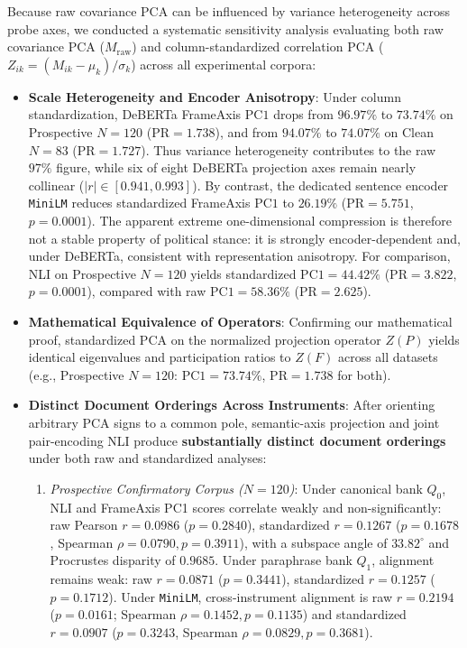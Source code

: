 Because raw covariance PCA can be influenced by variance heterogeneity across probe axes, we conducted a systematic sensitivity analysis evaluating both raw covariance PCA ($M_{\text{raw}}$) and column-standardized correlation PCA ($Z_{ik} = (M_{ik} - \mu_k) / \sigma_k$) across all experimental corpora:
\begin{itemize}
    \item \textbf{Scale Heterogeneity and Encoder Anisotropy}: Under column standardization, DeBERTa FrameAxis $\mathrm{PC1}$ drops from $96.97\%$ to $\mathbf{73.74\%}$ on Prospective $N=120$ ($\mathrm{PR} = 1.738$), and from $94.07\%$ to $\mathbf{74.07\%}$ on Clean $N=83$ ($\mathrm{PR} = 1.727$). Thus variance heterogeneity contributes to the raw $97\%$ figure, while six of eight DeBERTa projection axes remain nearly collinear ($|r| \in [0.941, 0.993]$). By contrast, the dedicated sentence encoder \texttt{MiniLM} reduces standardized FrameAxis $\mathrm{PC1}$ to $26.19\%$ ($\mathrm{PR} = 5.751$, $p = 0.0001$). The apparent extreme one-dimensional compression is therefore not a stable property of political stance: it is strongly encoder-dependent and, under DeBERTa, consistent with representation anisotropy. For comparison, NLI on Prospective $N=120$ yields standardized $\mathrm{PC1} = \mathbf{44.42\%}$ ($\mathrm{PR} = 3.822$, $p = 0.0001$), compared with raw $\mathrm{PC1} = 58.36\%$ ($\mathrm{PR} = 2.625$).
    \item \textbf{Mathematical Equivalence of Operators}: Confirming our mathematical proof, standardized PCA on the normalized projection operator $Z(P)$ yields identical eigenvalues and participation ratios to $Z(F)$ across all datasets (e.g., Prospective $N=120$: $\mathrm{PC1} = 73.74\%$, $\mathrm{PR} = 1.738$ for both).
    \item \textbf{Distinct Document Orderings Across Instruments}: After orienting arbitrary PCA signs to a common pole, semantic-axis projection and joint pair-encoding NLI produce \textbf{substantially distinct document orderings} under both raw and standardized analyses:
    \begin{enumerate}
        \item \emph{Prospective Confirmatory Corpus ($N=120$)}: Under canonical bank $Q_0$, NLI and FrameAxis PC1 scores correlate weakly and non-significantly: raw Pearson $r = \mathbf{0.0986}$ ($p = 0.2840$), standardized $r = \mathbf{0.1267}$ ($p = 0.1678$, Spearman $\rho = 0.0790, p = 0.3911$), with a subspace angle of $33.82^\circ$ and Procrustes disparity of $0.9685$. Under paraphrase bank $Q_1$, alignment remains weak: raw $r = 0.0871$ ($p = 0.3441$), standardized $r = 0.1257$ ($p = 0.1712$). Under \texttt{MiniLM}, cross-instrument alignment is raw $r = 0.2194$ ($p = 0.0161$; Spearman $\rho = 0.1452, p = 0.1135$) and standardized $r = \mathbf{0.0907}$ ($p = 0.3243$, Spearman $\rho = 0.0829, p = 0.3681$).

\end{enumerate}
\end{itemize}
